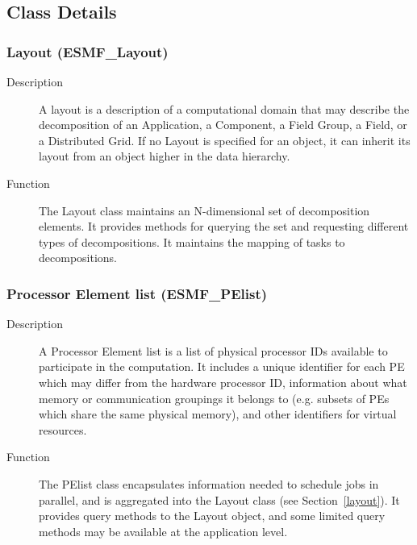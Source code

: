\subsection{Class Details}

\subsubsection{Layout (ESMF\_Layout)}
\label{sec:layout} 
\begin{description}
\item [Description] A layout is a description of a computational domain that
may describe the decomposition of an Application, a Component, a Field Group, a Field, or 
a Distributed Grid.
If no Layout is specified for an object, it can inherit its layout from an object
higher in the data hierarchy.  
\item [Function] The Layout class maintains an N-dimensional set of decomposition
elements.  It provides methods for querying the set and requesting different
types of decompositions.  It maintains the mapping of tasks to decompositions.
\end{description}

\subsubsection{Processor Element list (ESMF\_PElist)}
\label{sec:pelist} 
\begin{description}
\item [Description] A Processor Element list is a list of physical processor IDs
available to participate in the computation.  
It includes a unique identifier for each PE which may differ from the
hardware processor ID, 
information about what memory or communication groupings it belongs to (e.g. subsets 
of PEs which share the same physical memory), 
and other identifiers for virtual resources.  
\item [Function] The PElist class encapsulates information needed to schedule
jobs in parallel, and is aggregated into the Layout class (see Section~\ref{layout}).
It provides query methods to the Layout object, and some limited query methods
may be available at the application level.
\end{description}

